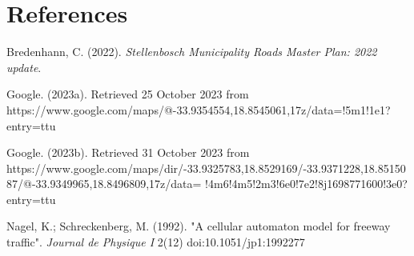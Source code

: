 \documentclass{article}
\begin{document}
\pagebreak

\section*{References}


Bredenhann, C. (2022). \textit{Stellenbosch Municipality Roads Master Plan: 2022 update}.

Google. (2023a). Retrieved 25 October 2023 from https://www.google.com/maps/@-33.9354554,18.8545061,17z/data=!5m1!1e1?entry=ttu

Google. (2023b). Retrieved 31 October 2023 from https://www.google.com/maps/dir/-33.9325783,18.8529169/-33.9371228,18.8515087/@-33.9349965,18.8496809,17z/data=
!4m6!4m5!2m3!6e0!7e2!8j1698771600!3e0?entry=ttu

Nagel, K.; Schreckenberg, M. (1992). "A cellular automaton model for freeway traffic". \textit{Journal de Physique I} 2(12) doi:10.1051/jp1:1992277
\end{document}
